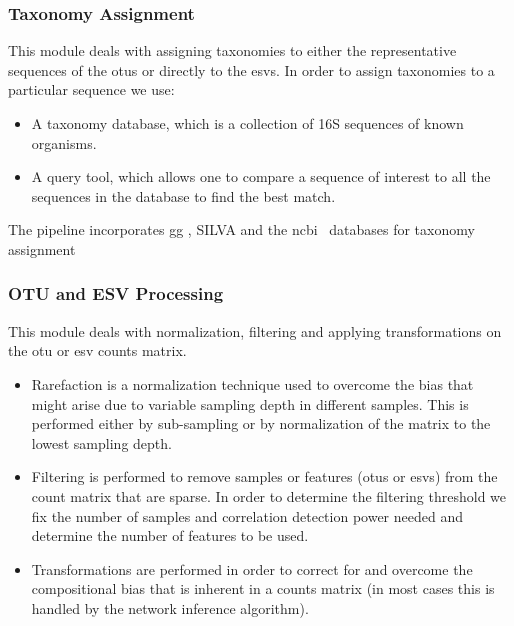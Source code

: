     \subsubsection*{Taxonomy Assignment}
      \vspace{-5mm}
      This module deals with assigning taxonomies to either the representative sequences of the \ac{otu}s or directly to the \ac{esv}s.
      In order to assign taxonomies to a particular sequence we use:
      \begin{itemize}
        \item A taxonomy database, which is a collection of 16S sequences of known organisms.
        \item A query tool, which allows one to compare a sequence of interest to all the sequences in the database to find the best match.
      \end{itemize}
      The pipeline incorporates \ac{gg} \cite{DeSantis2006}, SILVA \cite{Quast2012} and the \ac{ncbi}~\cite{Sayers2009} databases for taxonomy assignment

    \subsubsection*{OTU and ESV Processing}
      \vspace{-5mm}
      This module deals with normalization, filtering and applying transformations on the \ac{otu} or \ac{esv} counts matrix.
      \begin{itemize}
        \item Rarefaction is a normalization technique used to overcome the bias that might arise due to variable sampling depth in different samples. This is performed either by sub-sampling or by normalization of the matrix to the lowest sampling depth.
        \item Filtering is performed to remove samples or features (\ac{otu}s or \ac{esv}s) from the count matrix that are sparse. In order to determine the filtering threshold we fix the number of samples and correlation detection power needed  and determine the number of features to be used.
        \item Transformations are performed in order to correct for and overcome the compositional bias that is inherent in a counts matrix (in most cases this is handled by the network inference algorithm).
      \end{itemize}

